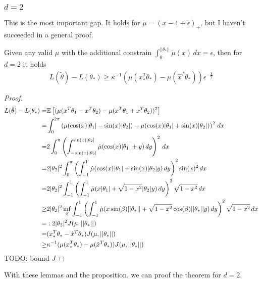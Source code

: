 \subsubsection{$d=2$}
\color{red}This is the most important gap. It holds for $\mu = (x-1+\epsilon)_+$, but I haven't succeeded in a general proof.\color{black}
\begin{proposition}
Given any valid $\mu$ with the additional constrain $\int_0^{||\theta_*||}\dot{\mu}(x)\,dx=\epsilon$, then for $d=2$ it holds 
\begin{align*}
    L(\tilde{\theta})-L(\theta_*) \geq \kappa^{-1}(\mu(x_*^T\theta_*)-\mu(\hat{x}^T\theta_*))\epsilon^{-\frac{3}{2}}
\end{align*}
\end{proposition}
\begin{proof}

\begin{align*}
    L(\tilde{\theta})-L(\theta_*)
    =&\mathbb{E}\left[(\mu(x^T\theta_1-x^T\theta_2)-\mu(x^T\theta_1+x^T\theta_2))^2\right]\\
    =&\int_{0}^{2\pi}\left(\mu(\cos(x)|\theta_1|-\sin(x)|\theta_2|)-\mu(\cos(x)|\theta_1|+\sin(x)|\theta_2|)\right)^2\, dx\\
    =&2\int_{0}^{\pi}\left(\int_{-\sin(x)|\theta_2|}^{\sin(x)|\theta_2|}\dot{\mu}(\cos(x)|\theta_1|+y)\,dy\right)^2\, dx\\
    =&2|\theta_2|^2\int_{0}^{\pi}\left(\int_{-1}^{1}\dot{\mu}(\cos(x)|\theta_1|+\sin(x)|\theta_2|y)\,dy\right)^2\sin(x)^2\, dx\\
    =&2|\theta_2|^2\int_{-1}^{1}\left(\int_{-1}^{1}\dot{\mu}(x|\theta_1|+\sqrt{1-x^2}|\theta_2|y)\,dy\right)^2\sqrt{1-x^2}\, dx\\
    \geq &2|\theta_2|^2 \inf_{\beta}\int_{-1}^{1}\left(\int_{-1}^{1}\dot{\mu}(x\sin(\beta)||\theta_*||+\sqrt{1-x^2}\cos(\beta)||\theta_*||y)\,dy\right)^2\sqrt{1-x^2}\, dx\\
    =&:2|\theta_2|^2J(\mu,||\theta_*||)\\
    =&(x_*^T\theta_*-\hat{x}^T\theta_*) J(\mu,||\theta_*||)\\
    \geq&\kappa^{-1}(\mu(x_*^T\theta_*)-\mu(\hat{x}^T\theta_*)) J(\mu,||\theta_*||)\\
\end{align*}
\color{red}TODO: bound $J$\color{black}
\end{proof}
With these lemmas and the proposition, we can proof the theorem for $d=2$.\\
